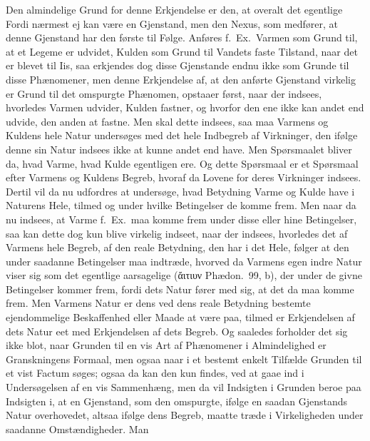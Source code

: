 \documentclass[12pt,a4paper]{book}
\newcommand{\apage}[1]{\marginnote{\footnotesize\textit{[#1]}}}
\begin{document}
Den almindelige Grund for denne Erkjendelse er den, at overalt det egentlige Fordi
nærmest ej kan være en Gjenstand, men den Nexus, som medfører, at denne Gjenstand
har den første til Følge. Anføres f.~Ex.\ Varmen som Grund til, at et Legeme er
udvidet, Kulden som Grund til Vandets faste Tilstand, naar det er blevet til Iis,
saa erkjendes dog disse Gjenstande endnu ikke som Grunde til disse Phænomener, men
denne Erkjendelse af, at den anførte Gjenstand virkelig er Grund til det omspurgte
Phænomen, opstaaer først, naar der indsees, hvorledes Varmen udvider, Kulden
fastner, og hvorfor den ene ikke kan andet end udvide, den anden at fastne. Men
skal dette indsees, saa maa Varmens og Kuldens hele Natur undersøges med det hele
Indbegreb af Virkninger, den ifølge denne sin Natur indsees ikke at kunne andet
end have. Men Spørsmaalet bliver da, hvad Varme, hvad Kulde egentligen ere. Og
dette Spørsmaal er et Spørsmaal efter Varmens og Kuldens Begreb, hvoraf da Lovene
for deres Virkninger indsees. Dertil vil da nu udfordres at undersøge, hvad
Betydning Varme og Kulde have i Naturens Hele, tilmed og under hvilke Betingelser
de komme frem. \apage{93} Men naar da nu indsees, at Varme f.~Ex.\ maa komme frem under
disse eller hine Betingelser, saa kan dette dog kun blive virkelig indseet, naar
der indsees, hvorledes det af Varmens hele Begreb, af den reale Betydning, den
har i det Hele, følger at den under saadanne Betingelser maa indtræde, hvorved da
Varmens egen indre Natur viser sig som det egentlige aarsagelige (ἄιτιυν
Phædon.\ 99, b),%
 der under de givne Betingelser kommer frem, fordi dets Natur fører med sig, at
det da maa komme frem. Men Varmens Natur er dens ved dens reale Betydning bestemte
ejendommelige Beskaffenhed eller Maade at være paa, tilmed er Erkjendelsen af dets
Natur eet med Erkjendelsen af dets Begreb. Og saaledes forholder det sig ikke
blot, naar Grunden til en vis Art af Phænomener i Almindelighed er Granskningens
Formaal, men ogsaa naar i et bestemt enkelt Tilfælde Grunden til et vist Factum
søges; ogsaa da kan den kun findes, ved at gaae ind i Undersøgelsen af en vis
Sammenhæng, men da vil Indsigten i Grunden beroe paa Indsigten i, at en Gjenstand,
som den omspurgte, ifølge en saadan Gjenstands Natur overhovedet, altsaa ifølge
dens Begreb, maatte træde i Virkeligheden under saadanne Omstændigheder. Man
\end{document}
